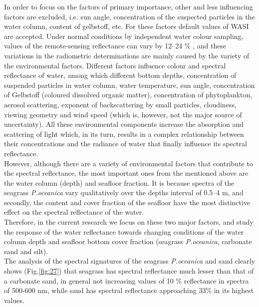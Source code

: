 \documentclass[11pt]{article}
\begin{document}
In order to focus on the factors of primary importance, other and less influencing factors are excluded,
i.e. sun angle, concentration of the suspected particles in the water column, content of gelbstoff, etc.
For these factors default values of WASI are accepted.
Under normal conditions by independent water colour sampling, values of the remote-sensing
reflectance can vary by 12–24 \% \cite{Toole00}\label{Toole00}, and these variations in the radiometric
determinations are mainly caused by the variety of the environmental factors.
Different factors influence colour and spectral reflectance of water, among which different bottom
depths, concentration of suspended particles in water column, water temperature, sun angle,
concentration of Gelbstoff (coloured dissolved organic matter), concentration of phytoplankton,
aerosol scattering, exponent of backscattering by small particles, cloudiness, viewing geometry and
wind speed (which is, however, not the major source of uncertainty). All these environmental
components increase the absorption and scattering of light which, in its turn, results in a complex
relationship between their concentrations and the radiance of water that finally influence its spectral
reflectance.\\
However, although there are a variety of environmental factors that contribute to the spectral
reflectance, the most important ones from the mentioned above are the water column (depth) and seafloor fraction.
It is because spectra of the seagrass \textit{P.oceanica} vary qualitatively over the depths interval of 0.5–4 m,
and secondly, the content and cover fraction of the seafloor have the most distinctive effect on the
spectral reflectance of the water. \\
Therefore, in the current research we focus on these two major factors, and study the response of the
water reflectance towards changing conditions of the water column depth and seafloor bottom cover
fraction (seagrass \textit{P.oceanica}, carbonate sand and silt).\\
The analysis of the spectral signatures of the seagrass \textit{P.oceanica} and sand clearly shows (Fig.\ref{fig:27}) that seagrass
has spectral reflectance much lesser than that of a carbonate sand, in general not increasing values of
10 \% reflectance in spectra of 500-600 nm, while sand has spectral reflectance approaching 33\% in its
highest values.
\end{document}

